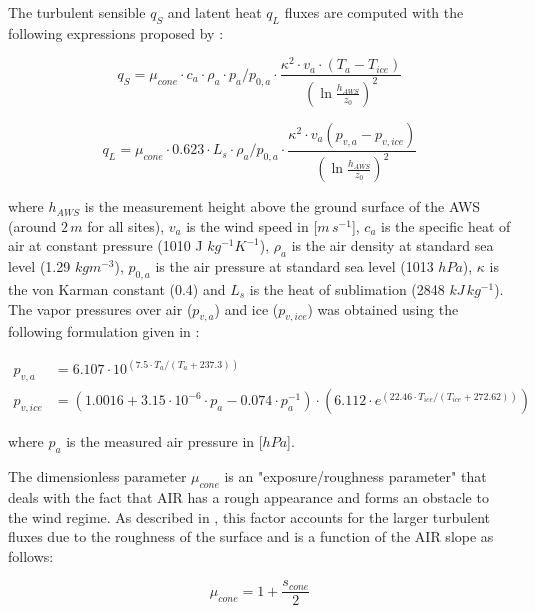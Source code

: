 \documentclass[utf8]{frontiersSCNS} %
\begin{document}
The turbulent sensible $q_{S}$ and latent heat $q_{L}$ fluxes are computed with the following expressions proposed by
\cite{Garratt_1992}:

\begin{equation} q_{S}=\mu_{cone}\cdot c_{a} \cdot \rho_{a} \cdot p_{a}/p_{0,a} \cdot \frac{\kappa^2 \cdot v_a \cdot
		(T_a-T_{ice})}{{(\ln{\frac{h_{AWS}}{z_{0}}})}^2} \label{eqn:qs} \end{equation}

\begin{equation} q_{L}=\mu_{cone}\cdot 0.623 \cdot L_s \cdot \rho_{a}/p_{0,a} \cdot \frac{\kappa^2 \cdot
	v_a(p_{v,a}-p_{v,ice})}{{(\ln{\frac{h_{AWS}}{z_{0}}})}^2} \end{equation}

where $h_{AWS}$ is the measurement height above the ground surface of the AWS (around $2\,m$ for all sites), $v_a$ is
the wind speed in [$m\,s^{-1}$], $c_a$ is the specific heat of air at constant pressure (1010 J $kg^{-1} K^{-1}$),
$\rho_{a}$ is the air density at standard sea level (1.29 $kg m^{-3}$), $p_{0,a}$ is the air pressure at standard sea
level (1013 $hPa$), $\kappa$ is the von Karman constant (0.4) and $L_s$ is the heat of sublimation (2848 $kJ\,
	kg^{-1}$).  The vapor pressures over air ($p_{v,a}$) and ice ($p_{v,ice}$) was obtained using the following formulation
given in \cite{WMO_2018}:

\begin{equation} \begin{split} p_{v,a}&=6.107 \cdot 10^{(7.5 \cdot T_a / (T_a + 237.3))}\\ p_{v,ice}&=(1.0016 +
		3.15\cdot10^{-6}\cdot p_{a}-0.074\cdot p_{a}^{-1})\cdot(6.112 \cdot e^{(22.46 \cdot T_{ice} / (T_{ice} + 272.62))})
	\end{split} \label{eqn:vp} \end{equation}

where $p_{a}$ is the measured air pressure in [$hPa$].

The dimensionless parameter $\mu_{cone}$ is an "exposure/roughness parameter" that deals with the fact that AIR has a
rough appearance and forms an obstacle to the wind regime. As described in \cite{Oerlemans_2021}, this factor accounts
for the larger turbulent fluxes due to the roughness of the surface and is a function of the AIR slope as follows:

\begin{equation}
	\mu_{cone} = 1 + \frac{s_{cone}}{2}
\end{equation}
\end{document}
